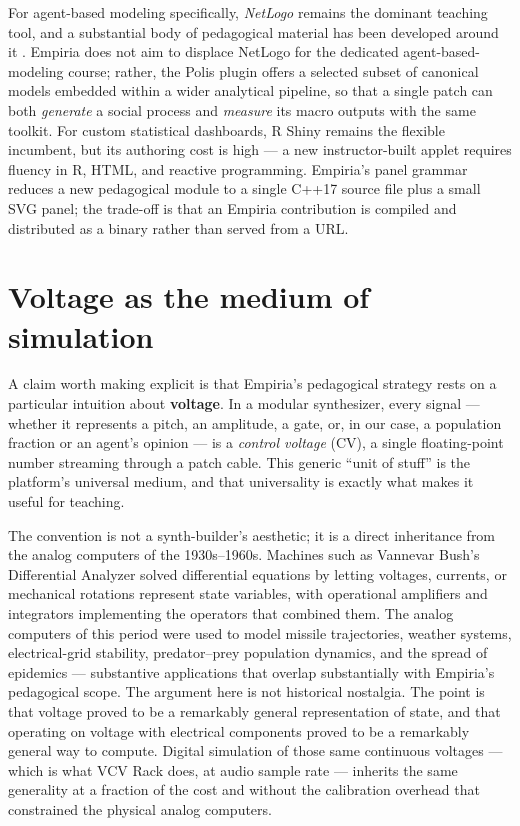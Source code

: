 For agent-based modeling specifically, \emph{NetLogo}
\citep{wilensky1999} remains the dominant teaching tool, and a
substantial body of pedagogical material has been developed around it
\citep{epstein2006}. Empiria does not aim to displace NetLogo for the
dedicated agent-based-modeling course; rather, the Polis plugin offers a
selected subset of canonical models embedded within a wider analytical
pipeline, so that a single patch can both \emph{generate} a social
process and \emph{measure} its macro outputs with the same toolkit. For
custom statistical dashboards, R Shiny remains the flexible incumbent,
but its authoring cost is high --- a new instructor-built applet
requires fluency in R, HTML, and reactive programming. Empiria's panel
grammar reduces a new pedagogical module to a single C++17 source file
plus a small SVG panel; the trade-off is that an Empiria contribution is
compiled and distributed as a binary rather than served from a URL.

\section{Voltage as the medium of
simulation}\label{voltage-as-the-medium-of-simulation}

A claim worth making explicit is that Empiria's pedagogical strategy
rests on a particular intuition about \textbf{voltage}. In a modular
synthesizer, every signal --- whether it represents a pitch, an
amplitude, a gate, or, in our case, a population fraction or an agent's
opinion --- is a \emph{control voltage} (CV), a single floating-point
number streaming through a patch cable. This generic ``unit of stuff''
is the platform's universal medium, and that universality is exactly
what makes it useful for teaching.

The convention is not a synth-builder's aesthetic; it is a direct
inheritance from the analog computers of the 1930s--1960s. Machines such
as Vannevar Bush's Differential Analyzer \citep{bush1931} solved
differential equations by letting voltages, currents, or mechanical
rotations represent state variables, with operational amplifiers and
integrators implementing the operators that combined them. The analog
computers of this period were used to model missile trajectories,
weather systems, electrical-grid stability, predator--prey population
dynamics, and the spread of epidemics \citep{small2001} --- substantive
applications that overlap substantially with Empiria's pedagogical
scope. The argument here is not historical nostalgia. The point is that
voltage proved to be a remarkably general representation of state, and
that operating on voltage with electrical components proved to be a
remarkably general way to compute. Digital simulation of those same
continuous voltages --- which is what VCV Rack does, at audio sample
rate \citep{vcv-rack} --- inherits the same generality at a fraction of
the cost and without the calibration overhead that constrained the
physical analog computers.

